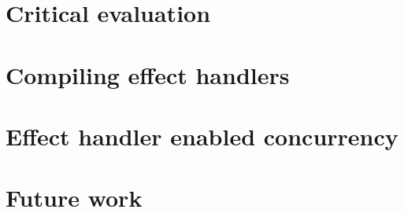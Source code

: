 \documentclass[12pt,mscres,cdtppar,twoside,openright,logo,rightchapter,normalheadings]{infthesis}
\theoremstyle{definition}
\begin{document}
\section{Critical evaluation}
\label{sec:criticaleval}

\section{Compiling effect handlers}
\label{sec:conclude-compiling}

\section{Effect handler enabled concurrency}
\label{sec:conclude-concurrency}

\section{Future work}
\label{sec:futurework}



%

\nocite{*}
\singlespace



\end{document}
